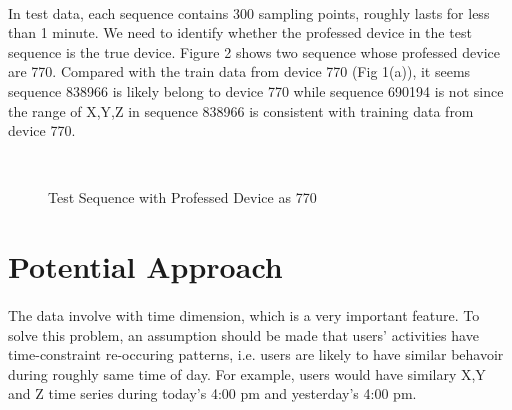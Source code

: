 \documentclass{article}
\begin{document}
	\paragraph{}In test data, each sequence contains 300 sampling points, roughly lasts for less than 1 minute. We need to identify whether the professed device in the test sequence is the true device. Figure 2 shows two sequence whose professed device are 770. Compared with the train data from device 770 (Fig 1(a)), it seems sequence 838966 is likely belong to device 770 while sequence 690194 is not since the range of X,Y,Z in sequence 838966 is consistent with training data from device 770. 
	\begin{figure}
		\centering
		\\
		\caption{Test Sequence with Professed Device as 770}
	\end{figure}
	
	

	\section{Potential Approach} %
	\label{sec:potential_approach}
	\paragraph{}The data involve with time dimension, which is a very important feature. To solve this problem, an assumption should be made that users' activities have time-constraint re-occuring patterns, i.e. users are likely to have similar behavoir during roughly same time of day. For example, users would have similary X,Y and Z time series during today's 4:00 pm and yesterday's 4:00 pm. 
\end{document}
